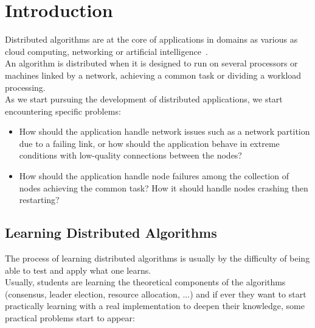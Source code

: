 \documentclass{eplmastersthesis}
\begin{document}
  \tableofcontents

  \chapter{Introduction}

    Distributed algorithms are at the core of applications in domains as
    various as cloud computing, networking or artificial
    intelligence~\cite{DistributedArtificialIntelligence}.\\
    An algorithm is distributed when it is designed to run on several
    processors or machines linked by a network, achieving a common task
    or dividing a workload processing.\\

    As we start pursuing the development of distributed applications,
    we start encountering specific problems:
    \begin{itemize}
      \item How should the application handle network issues such as
      a network partition due to a failing link, or how should the application
      behave in extreme conditions with low-quality connections between
      the nodes?
      \item How should the application handle node failures among the
      collection of nodes achieving the common task? How it should handle
      nodes crashing then restarting?
    \end{itemize}

    \section{Learning Distributed Algorithms}

      The process of learning distributed algorithms is usually by the
      difficulty of being able to test and apply what one learns.\\
      Usually, students are learning the theoretical components of the
      algorithms (consensus, leader election, resource allocation, ...)
      and if ever they want to start practically learning with a real
      implementation to deepen their knowledge, some practical problems
      start to appear:
\end{document}
